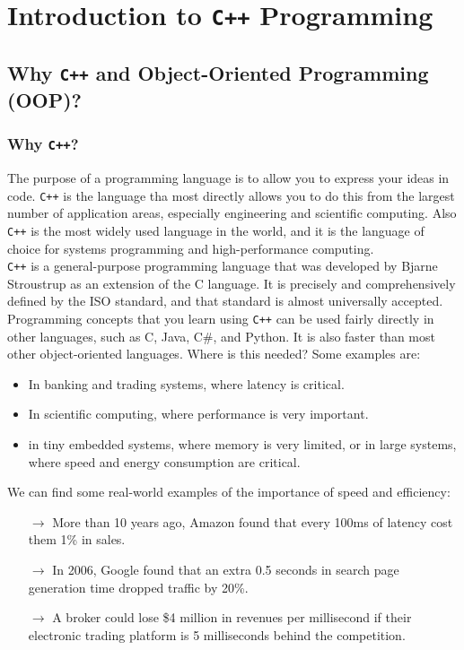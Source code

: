 \chapter{Introduction to \texttt{C++} Programming}

\section{Why \texttt{C++} and Object-Oriented Programming (OOP)?}

\subsection{Why \texttt{C++}?}

The purpose of a programming language is to allow you to express your ideas in code. 
\texttt{C++} is the language tha most directly allows you to do this from the largest number
of application areas, especially engineering and scientific computing. Also \texttt{C++} is the
most widely used language in the world, and it is the language of choice for systems programming
and high-performance computing.\\

\texttt{C++} is a general-purpose programming language that was developed by Bjarne Stroustrup as an 
extension of the C language. It is precisely and comprehensively defined by the ISO standard, and that 
standard is almost universally accepted. Programming concepts that you learn using \texttt{C++} can be 
used fairly directly in other languages, such as C, Java, C\#, and Python. It is also faster than most
other object-oriented languages. Where is this needed? Some examples are:

\begin{itemize}
    \item In banking and trading systems, where latency is critical.
    \item In scientific computing, where performance is very important.
    \item in tiny embedded systems, where memory is very limited, or in 
    large systems, where speed and energy consumption are critical.\\
\end{itemize}

We can find some real-world examples of the importance of speed and efficiency:
\begin{itemize}
    \item[\textbf{$\rightarrow$}] More than 10 years ago, Amazon found that every 100ms of latency cost 
    them 1\% in sales.
    \item[\textbf{$\rightarrow$}] In 2006, Google found that an extra 0.5 seconds in search page generation 
    time dropped traffic by 20\%.
    \item[\textbf{$\rightarrow$}] A broker could lose \$4 million in revenues per millisecond if their 
    electronic trading platform is 5 milliseconds behind the competition.
\end{itemize}

